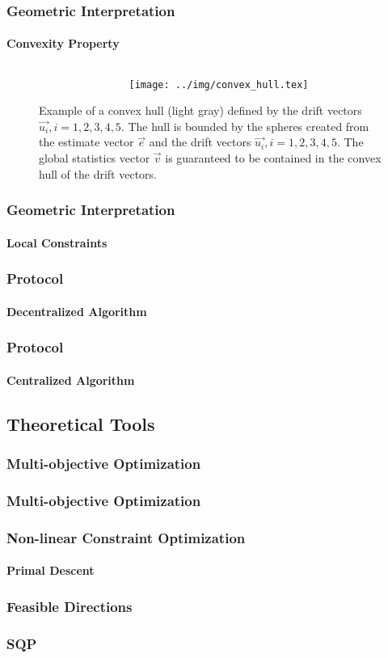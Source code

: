 \documentclass[hyperref={pdfpagelabels=false}]{beamer}
\begin{document}
\begin{frame} \frametitle{Geometric Interpretation}\framesubtitle{Convexity Property}
\begin{figure}[H]
\begin{columns}
\begin{column}[t]{0.35\textwidth}
\vspace{-6.1cm}
\caption{Example of a convex hull (light gray) defined by the drift vectors $\vec{u_i}, i=1,2,3,4,5$. The hull is bounded by the spheres created from the estimate vector $\vec{e}$ and the drift vectors $\vec{u_i}, i=1,2,3,4,5$. The global statistics vector $\vec{v}$ is guaranteed to be contained in the convex hull of the drift vectors.} 
\end{column}
\begin{column}[t]{0.65\textwidth}
\vspace{-4cm}
\texttt{[image: ../img/convex\_hull.tex]}
\end{column}
\end{columns}
\label{fig:convexHull}
\end{figure}
\end{frame}


\begin{frame} \frametitle{Geometric Interpretation}\framesubtitle{Local Constraints}

\end{frame}
\begin{frame} \frametitle{Protocol}\framesubtitle{Decentralized Algorithm}

\end{frame}
\begin{frame} \frametitle{Protocol}\framesubtitle{Centralized Algorithm}

\end{frame}
\subsection{Theoretical Tools}
\subsubsection*{Multi-objective Optimization}
\begin{frame} \frametitle{Multi-objective Optimization}

\end{frame}
\begin{frame} \frametitle{Non-linear Constraint Optimization}\framesubtitle{Primal Descent}

\end{frame}
\begin{frame} \frametitle{Feasible Directions}

\end{frame}
\begin{frame} \frametitle{SQP}

\end{frame}
\end{document}
